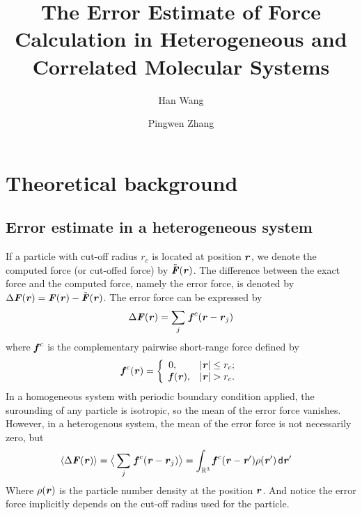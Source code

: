 \documentclass[aps,pre,preprint]{revtex4}
\renewcommand{\v}[1]{\textbf{\textit{#1}}}
\renewcommand{\d}[1]{\textsf{#1}}
\begin{document}
\title{The Error Estimate of Force Calculation in Heterogeneous and Correlated Molecular Systems}
\author{Han Wang}
\author{Pingwen Zhang}

\begin{abstract}
\end{abstract}

\maketitle

\section{Theoretical background}
\subsection{Error estimate in a heterogeneous system}

If a particle with cut-off radius $r_c$ is located at position $\v r$,
we denote the computed force (or cut-offed force) by $\tilde{\v F}(\v
r)$. The difference between the exact force and the computed force,
namely the error force, is denoted by $\Delta\v F(\v r) = \v F(\v r) -
\tilde{\v F}(\v r)$. The error force can be expressed by
\begin{align}
  \Delta\v F(\v r) = \sum_{j}\, \v f^c(\v r - \v r_j)
\end{align}
where $\v f^c$ is the complementary pairwise short-range force defined
by
\begin{align}
  \v f^c(\v r) =
  \left\{
  \begin{array}{ll}
    0, & \vert\v r\vert\leq r_c; \\
    \v f(\v r), & \vert\v r\vert > r_c.
  \end{array}
  \right.
\end{align}
In a homogeneous system with periodic boundary condition applied, the
surounding of any particle is isotropic, so the mean of the error
force vanishes. However, in a heterogenous system, the mean of the
error force is not necessarily zero, but
\begin{align} \label{eqn:tmp3} %
  \langle\Delta\v F(\v r)\rangle
  &=
  \big\langle
  \sum_{j}\, \v f^c(\v r - \v r_j)
  \big\rangle 
  =
  \int_{\mathbb R^3}\v f^c(\v r - \v r')\rho(\v r')\,\d d\v r'
\end{align}
Where $\rho(\v r)$ is the particle number density at the position $\v
r$. And notice the error force implicitly depends on the cut-off
radius used for the particle.
\end{document}
